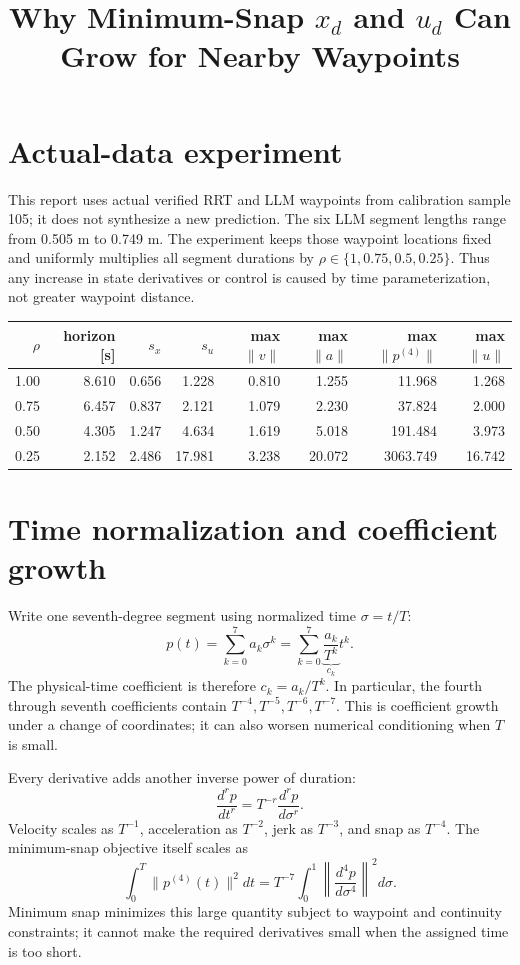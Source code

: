 \documentclass[11pt]{article}
\title{Why Minimum-Snap $x_d$ and $u_d$ Can Grow for Nearby Waypoints}\author{}\date{}
\begin{document}
\maketitle
\section*{Actual-data experiment}
This report uses actual verified RRT and LLM waypoints from calibration sample 105; it does not synthesize a new prediction. The six LLM segment lengths range from 0.505 m to 0.749 m. The experiment keeps those waypoint locations fixed and uniformly multiplies all segment durations by $\rho\in\{1,0.75,0.5,0.25\}$. Thus any increase in state derivatives or control is caused by time parameterization, not greater waypoint distance.

\begin{center}\small\begin{tabular}{rrrrrrrr}\toprule
$\rho$ & horizon [s] & $s_x$ & $s_u$ & max $\|v\|$ & max $\|a\|$ & max $\|p^{(4)}\|$ & max $\|u\|$\\\midrule
1.00 & 8.610 & 0.656 & 1.228 & 0.810 & 1.255 & 11.968 & 1.268 \\
0.75 & 6.457 & 0.837 & 2.121 & 1.079 & 2.230 & 37.824 & 2.000 \\
0.50 & 4.305 & 1.247 & 4.634 & 1.619 & 5.018 & 191.484 & 3.973 \\
0.25 & 2.152 & 2.486 & 17.981 & 3.238 & 20.072 & 3063.749 & 16.742 \\
\bottomrule\end{tabular}\end{center}

\section*{Time normalization and coefficient growth}
Write one seventh-degree segment using normalized time $\sigma=t/T$:
\[
p(t)=\sum_{k=0}^7 a_k\sigma^k
=\sum_{k=0}^7 \underbrace{\frac{a_k}{T^k}}_{c_k}t^k.
\]
The physical-time coefficient is therefore $c_k=a_k/T^k$. In particular, the fourth through seventh coefficients contain $T^{-4},T^{-5},T^{-6},T^{-7}$. This is coefficient growth under a change of coordinates; it can also worsen numerical conditioning when $T$ is small.

Every derivative adds another inverse power of duration:
\[
\frac{d^r p}{dt^r}=T^{-r}\frac{d^r p}{d\sigma^r}.
\]
Velocity scales as $T^{-1}$, acceleration as $T^{-2}$, jerk as $T^{-3}$, and snap as $T^{-4}$. The minimum-snap objective itself scales as
\[
\int_0^T \|p^{(4)}(t)\|^2dt
=T^{-7}\int_0^1\left\|\frac{d^4p}{d\sigma^4}\right\|^2d\sigma.
\]
Minimum snap minimizes this large quantity subject to waypoint and continuity constraints; it cannot make the required derivatives small when the assigned time is too short.
\end{document}
